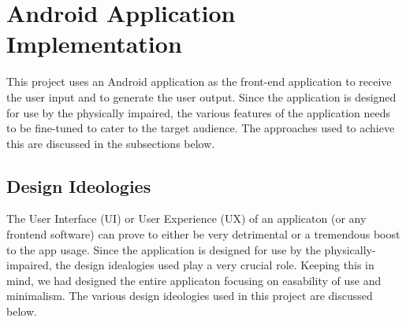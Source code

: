 \documentclass[14pt]{report}
\begin{document}
		\section{Android Application Implementation}
			This project uses an Android application as the front-end application to receive the user input and to generate the user output. Since the application is designed for use by the physically impaired, the various features of the application needs to be fine-tuned to cater to the target audience. The approaches used to achieve this are discussed in the subsections below.
			\subsection{Design Ideologies}
				The User Interface (UI) or User Experience (UX) of an applicaton (or any frontend software) can prove to either be very detrimental or a tremendous boost to the app usage. Since the application is designed for use by the physically-impaired, the design idealogies used play a very crucial role. Keeping this in mind, we had designed the entire applicaton focusing on easability of use and minimalism. The various design ideologies used in this project are discussed below.
\end{document}
